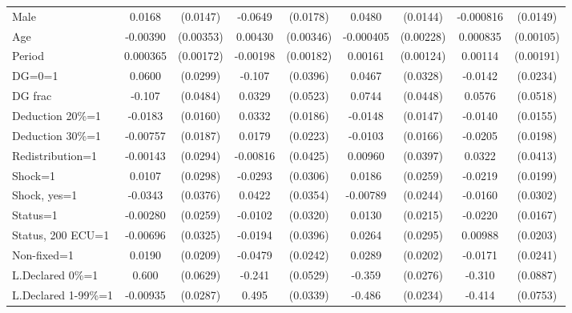 \begin{tabular}{l|cccccc|cc}
Male            &   0.0168         & (0.0147)&  -0.0649\sym{***}& (0.0178)&   0.0480\sym{***}& (0.0144)&-0.000816         & (0.0149)\\
Age             & -0.00390         &(0.00353)&  0.00430         &(0.00346)&-0.000405         &(0.00228)& 0.000835         &(0.00105)\\
Period          & 0.000365         &(0.00172)& -0.00198         &(0.00182)&  0.00161         &(0.00124)&  0.00114         &(0.00191)\\
DG=0=1          &   0.0600\sym{**} & (0.0299)&   -0.107\sym{***}& (0.0396)&   0.0467         & (0.0328)&  -0.0142         & (0.0234)\\
DG frac         &   -0.107\sym{**} & (0.0484)&   0.0329         & (0.0523)&   0.0744\sym{*}  & (0.0448)&   0.0576         & (0.0518)\\
Deduction 20\%=1&  -0.0183         & (0.0160)&   0.0332\sym{*}  & (0.0186)&  -0.0148         & (0.0147)&  -0.0140         & (0.0155)\\
Deduction 30\%=1& -0.00757         & (0.0187)&   0.0179         & (0.0223)&  -0.0103         & (0.0166)&  -0.0205         & (0.0198)\\
Redistribution=1& -0.00143         & (0.0294)& -0.00816         & (0.0425)&  0.00960         & (0.0397)&   0.0322         & (0.0413)\\
Shock=1         &   0.0107         & (0.0298)&  -0.0293         & (0.0306)&   0.0186         & (0.0259)&  -0.0219         & (0.0199)\\
Shock, yes=1    &  -0.0343         & (0.0376)&   0.0422         & (0.0354)& -0.00789         & (0.0244)&  -0.0160         & (0.0302)\\
Status=1        & -0.00280         & (0.0259)&  -0.0102         & (0.0320)&   0.0130         & (0.0215)&  -0.0220         & (0.0167)\\
Status, 200 ECU=1& -0.00696         & (0.0325)&  -0.0194         & (0.0396)&   0.0264         & (0.0295)&  0.00988         & (0.0203)\\
Non-fixed=1     &   0.0190         & (0.0209)&  -0.0479\sym{**} & (0.0242)&   0.0289         & (0.0202)&  -0.0171         & (0.0241)\\
L.Declared 0\%=1&    0.600\sym{***}& (0.0629)&   -0.241\sym{***}& (0.0529)&   -0.359\sym{***}& (0.0276)&   -0.310\sym{***}& (0.0887)\\
L.Declared 1-99\%=1& -0.00935         & (0.0287)&    0.495\sym{***}& (0.0339)&   -0.486\sym{***}& (0.0234)&   -0.414\sym{***}& (0.0753)\\

\end{tabular}
